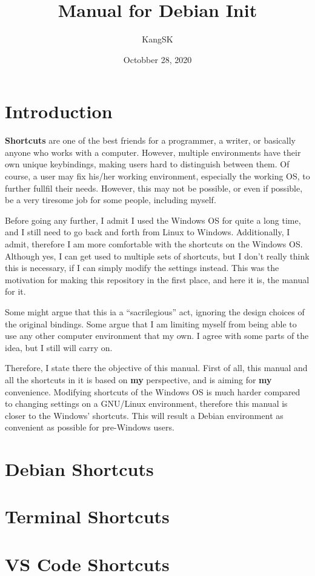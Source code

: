 \documentclass[10pt]{article}
\title{Manual for Debian Init}
\author{KangSK}
\date{Octobber 28, 2020}
\begin{document}
\doublespacing

\maketitle\label{Title}

\section*{Introduction}

	\textbf{Shortcuts} are one of the best friends for a programmer, a writer, or basically anyone who works with a computer.
	However, multiple environments have their own unique keybindings, making users hard to distinguish between them.
	Of course, a user may fix his/her working environment, especially the working OS, to further fullfil their needs.
	However, this may not be possible, or even if possible, be a very tiresome job for some people, including myself.

	Before going any further, I admit I used the Windows OS for quite a long time, and I still need to go back and forth from Linux to Windows.
	Additionally, I admit, therefore I am more comfortable with the shortcuts on the Windows OS.
	Although yes, I can get used to multiple sets of shortcuts, but I don't really think this is necessary, if I can simply modify the settings instead.
	This was the motivation for making this repository in the first place, and here it is, the manual for it.

	Some might argue that this ia a ``sacrilegious'' act, ignoring the design choices of the original bindings.
	Some argue that I am limiting myself from being able to use any other computer environment that my own.
	I agree with some parts of the idea, but I still will carry on.

	Therefore, I state there the objective of this manual.
	First of all, this manual and all the shortcuts in it is based on \textbf{my} perspective, and is aiming for \textbf{my} convenience.
	Modifying shortcuts of the Windows OS is much harder compared to changing settings on a GNU/Linux environment, therefore this manual is closer to the Windows' shortcuts.
	This will result a Debian environment as convenient as possible for pre-Windows users.

	\newpage

\section{Debian Shortcuts}
\section{Terminal Shortcuts}
\section{VS Code Shortcuts}
\end{document}
